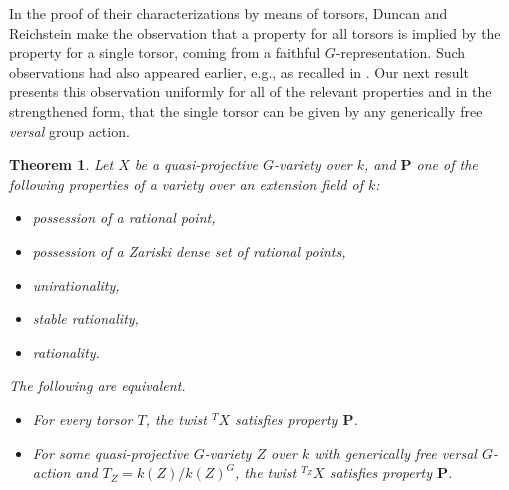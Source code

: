 \documentclass[12pt, reqno]{amsart}
\numberwithin{equation}{section}
\theoremstyle{plain}
\newtheorem{theo}[prop]{Theorem}
\theoremstyle{definition}
\begin{document}
In the proof of their characterizations by means of torsors, Duncan and Reichstein make the observation that a property for all torsors is implied by the property for a single torsor, coming from a faithful $G$-representation.
Such observations had also appeared earlier, e.g., as recalled in \cite[Prop.\ 2.1]{GM}.
Our next result presents this observation uniformly for all of the relevant properties and in the strengthened form, that the single torsor can be given by any generically free \emph{versal} group action.

\begin{theo}
\label{thm.onetorsorP}
Let $X$ be a quasi-projective $G$-variety over $k$, and
$\mathbf{P}$ one of the following properties of a variety over an extension field of $k$: 
\begin{itemize}
    \item possession of a rational point,
\item possession of a Zariski dense set of rational points,
\item unirationality,
\item stable rationality,
\item rationality.
\end{itemize}
The following are equivalent.
\begin{itemize}
\item[(i)] For every torsor $T$, the twist
${}^TX$ satisfies property $\mathbf{P}$.
\item[(ii)] For some quasi-projective $G$-variety $Z$ over $k$ with generically free versal $G$-action and 
$T_Z=k(Z)/k(Z)^G$, 
the twist ${}^{T_Z}X$ 
satisfies property $\mathbf{P}$.
\end{itemize}
\end{theo}
\end{document}

